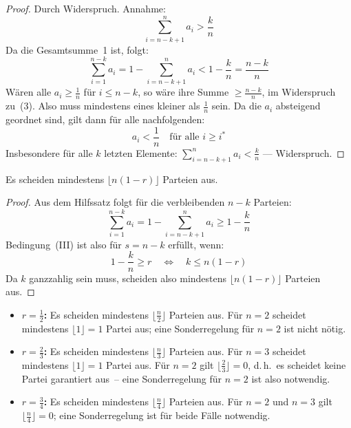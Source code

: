 \begin{proof}
  Durch Widerspruch. Annahme:
\begin{equation}
  \sum_{i=n-k+1}^{n} a_i > \frac{k}{n}
\end{equation}
Da die Gesamtsumme~1 ist, folgt:
\begin{equation}
  \sum_{i=1}^{n-k} a_i = 1 - \sum_{i=n-k+1}^{n} a_i < 1 - \frac{k}{n} = \frac{n-k}{n}
\end{equation}
Wären alle $a_i \geq \frac{1}{n}$ für $i \leq n-k$, so wäre ihre Summe $\geq \frac{n-k}{n}$,
im Widerspruch zu~(3). Also muss mindestens eines kleiner als $\frac{1}{n}$ sein. Da die
$a_i$ absteigend geordnet sind, gilt dann für alle nachfolgenden:
\begin{equation}
  a_i < \frac{1}{n} \quad \text{für alle } i \geq i^*
\end{equation}
Insbesondere für alle $k$ letzten Elemente: $\displaystyle\sum_{i=n-k+1}^{n} a_i < \frac{k}{n}$
--- Widerspruch.
\end{proof}

\begin{hauptsatz}
Es scheiden mindestens $\lfloor n(1-r) \rfloor$ Parteien aus.
\end{hauptsatz}

\begin{proof}
Aus dem Hilfssatz folgt für die verbleibenden $n-k$ Parteien:
\begin{equation}
  \sum_{i=1}^{n-k} a_i = 1 - \sum_{i=n-k+1}^{n} a_i \geq 1 - \frac{k}{n}
\end{equation}
Bedingung~(III) ist also für $s = n-k$ erfüllt, wenn:
\begin{equation}
  1 - \frac{k}{n} \geq r \quad \Longleftrightarrow \quad k \leq n(1-r)
\end{equation}
Da $k$ ganzzahlig sein muss, scheiden also mindestens $\lfloor n(1-r) \rfloor$ Parteien aus.
\end{proof}


\begin{itemize}
  \item \textbf{$r = \frac{1}{2}$:} Es scheiden mindestens $\lfloor \frac{n}{2} \rfloor$
    Parteien aus. Für $n = 2$ scheidet mindestens $\lfloor 1 \rfloor = 1$ Partei aus; eine
    Sonderregelung für $n = 2$ ist nicht nötig.

  \item \textbf{$r = \frac{2}{3}$:} Es scheiden mindestens $\lfloor \frac{n}{3} \rfloor$
    Parteien aus. Für $n = 3$ scheidet mindestens $\lfloor 1 \rfloor = 1$ Partei aus.
    Für $n = 2$ gilt $\lfloor \frac{2}{3} \rfloor = 0$, d.\,h.\ es scheidet keine Partei
    garantiert aus~-- eine Sonderregelung für $n = 2$ ist also notwendig.

  \item \textbf{$r = \frac{3}{4}$:} Es scheiden mindestens $\lfloor \frac{n}{4} \rfloor$
    Parteien aus. Für $n = 2$ und $n = 3$ gilt $\lfloor \frac{n}{4} \rfloor = 0$; eine
    Sonderregelung ist für beide Fälle notwendig.
\end{itemize}

